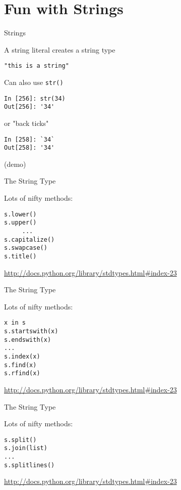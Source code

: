 \documentclass{beamer}
\begin{document}
\section{Fun with Strings}

\begin{frame}[fragile]{Strings}

{\Large A string literal creates a string type}

\begin{verbatim}
"this is a string"
\end{verbatim}

{\Large Can also use \verb|str()|}

\begin{verbatim}
In [256]: str(34)
Out[256]: '34'
\end{verbatim}
{\Large or "back ticks"}
\begin{verbatim}
In [258]: `34`
Out[258]: '34'
\end{verbatim}
(demo)
\end{frame} 

\begin{frame}[fragile]{The String Type}

{\Large Lots of nifty methods:}

\begin{verbatim}
s.lower()
s.upper()
     ...
s.capitalize()
s.swapcase()
s.title()
\end{verbatim}

\url{http://docs.python.org/library/stdtypes.html#index-23}

\end{frame} 

\begin{frame}[fragile]{The String Type}

{\Large Lots of nifty methods:}

\begin{verbatim}
x in s
s.startswith(x)
s.endswith(x)
...
s.index(x)
s.find(x)
s.rfind(x)
\end{verbatim}

\url{http://docs.python.org/library/stdtypes.html#index-23}

\end{frame} 

\begin{frame}[fragile]{The String Type}

{\Large Lots of nifty methods:}

\begin{verbatim}
s.split()
s.join(list)
...
s.splitlines()
\end{verbatim}

\url{http://docs.python.org/library/stdtypes.html#index-23}
\vfill

\end{frame} 
\end{document}
